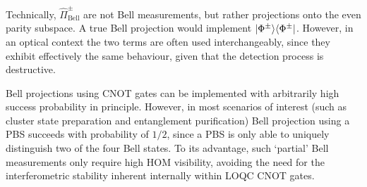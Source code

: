 Technically, $\hat\Pi^\pm_\text{Bell}$ are not Bell measurements, but rather projections onto the even parity subspace. A true Bell projection would implement $|\Phi^\pm\rangle\langle\Phi^\pm|$. However, in an optical context the two terms are often used interchangeably, since they exhibit effectively the same behaviour, given that the detection process is destructive.

Bell projections using CNOT gates can be implemented with arbitrarily high success probability in principle. However, in most scenarios of interest (such as cluster state preparation and entanglement purification) Bell projection using a PBS succeeds with probability of $1/2$, since a PBS is only able to uniquely distinguish two of the four Bell states. To its advantage, such `partial' Bell measurements only require high HOM visibility, avoiding the need for the interferometric stability inherent internally within LOQC CNOT gates.

